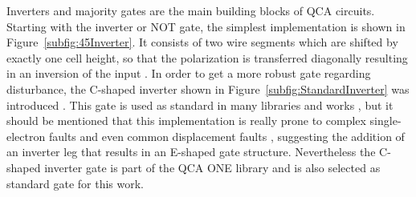 Inverters and majority gates are the main building blocks of QCA circuits. Starting with the inverter or NOT gate, the simplest implementation is shown in Figure~\ref{subfig:45Inverter}. It consists of two wire segments which are shifted by exactly one cell height, so that the polarization is transferred diagonally resulting in an inversion of the input \cite{Sasamal2020QuantumDotCA}. In order to get a more robust gate regarding disturbance, the C-shaped inverter shown in Figure~\ref{subfig:StandardInverter} was introduced \cite{QCA_scl}. This gate is used as standard in many libraries and works \cite{peng2020spars, fontes, sequential_cell_one, USE}, but it should be mentioned that this implementation is really prone to complex single-electron faults \cite{SingelElectronFaults} and even common displacement faults \cite{Inverter_displacements}, suggesting the addition of an inverter leg that results in an E-shaped gate structure. Nevertheless the C-shaped inverter gate is part of the QCA ONE library and is also selected as standard gate for this work.
